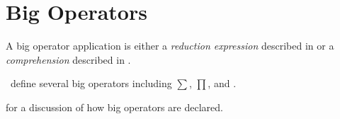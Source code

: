 %
%
%
%

\section{Big Operators}

A big operator application is either a \emph{reduction expression}
described in  or a \emph{comprehension}
described in .



\Library\ define several big operators including $\sum$, $\prod$,
and .

 for a discussion of how big operators are declared.
